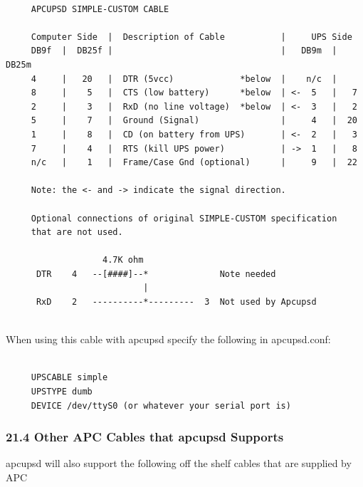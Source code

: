 \footnotesize
\begin{verbatim}
     
     APCUPSD SIMPLE-CUSTOM CABLE
     
     Computer Side  |  Description of Cable           |     UPS Side
     DB9f  |  DB25f |                                 |   DB9m  | DB25m
     4     |   20   |  DTR (5vcc)             *below  |    n/c  |
     8     |    5   |  CTS (low battery)      *below  | <-  5   |   7
     2     |    3   |  RxD (no line voltage)  *below  | <-  3   |   2
     5     |    7   |  Ground (Signal)                |     4   |  20
     1     |    8   |  CD (on battery from UPS)       | <-  2   |   3
     7     |    4   |  RTS (kill UPS power)           | ->  1   |   8
     n/c   |    1   |  Frame/Case Gnd (optional)      |     9   |  22
     
     Note: the <- and -> indicate the signal direction.
     
     Optional connections of original SIMPLE-CUSTOM specification
     that are not used.
     
                   4.7K ohm
      DTR    4   --[####]--*              Note needed
                           |
      RxD    2   ----------*---------  3  Not used by Apcupsd
     
\end{verbatim}
\normalsize

When using this cable with apcupsd specify the following in apcupsd.conf: 

\footnotesize
\begin{verbatim}
     
     UPSCABLE simple
     UPSTYPE dumb
     DEVICE /dev/ttyS0 (or whatever your serial port is)
\end{verbatim}
\normalsize

\label{Other-APC-Cables-that-apcupsd-Supports}

\subsubsection*{21.4 Other APC Cables that apcupsd Supports}

apcupsd will also support the following off the shelf cables that are supplied
by APC  

